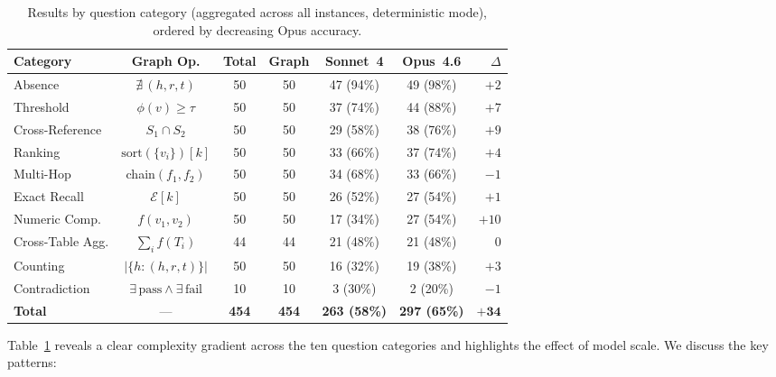 \documentclass[11pt]{article}
\begin{document}
\begin{table}[t]
\centering
\caption{Results by question category (aggregated across all instances,
deterministic mode), ordered by decreasing Opus accuracy.}
\label{tab:by_category}
\small
\begin{tabular}{lcccccr}
\toprule
Category & Graph Op. & Total & Graph & Sonnet~4 & Opus~4.6 & $\Delta$ \\
\midrule
Absence & $\nexists\,(h,r,t)$ & 50 & 50 & 47 (94\%) & 49 (98\%) & $+2$ \\
Threshold & $\phi(v) \geq \tau$ & 50 & 50 & 37 (74\%) & 44 (88\%) & $+7$ \\
Cross-Reference & $S_1 \cap S_2$ & 50 & 50 & 29 (58\%) & 38 (76\%) & $+9$ \\
Ranking & $\text{sort}(\{v_i\})[k]$ & 50 & 50 & 33 (66\%) & 37 (74\%) & $+4$ \\
Multi-Hop & chain$(f_1, f_2)$ & 50 & 50 & 34 (68\%) & 33 (66\%) & $-1$ \\
Exact Recall & $\mathcal{E}[k]$ & 50 & 50 & 26 (52\%) & 27 (54\%) & $+1$ \\
Numeric Comp. & $f(v_1, v_2)$ & 50 & 50 & 17 (34\%) & 27 (54\%) & $+10$ \\
Cross-Table Agg. & $\sum_i f(T_i)$ & 44 & 44 & 21 (48\%) & 21 (48\%) & $0$ \\
Counting & $|\{h : (h,r,t)\}|$ & 50 & 50 & 16 (32\%) & 19 (38\%) & $+3$ \\
Contradiction & $\exists\, \text{pass} \land \exists\, \text{fail}$ & 10 & 10 & 3 (30\%) & 2 (20\%) & $-1$ \\
\midrule
\textbf{Total} & --- & \textbf{454} & \textbf{454} & \textbf{263 (58\%)} & \textbf{297 (65\%)} & $\mathbf{+34}$ \\
\bottomrule
\end{tabular}
\end{table}

Table~\ref{tab:by_category} reveals a clear complexity gradient across
the ten question categories and highlights the effect of model scale.
We discuss the key patterns:
\end{document}

